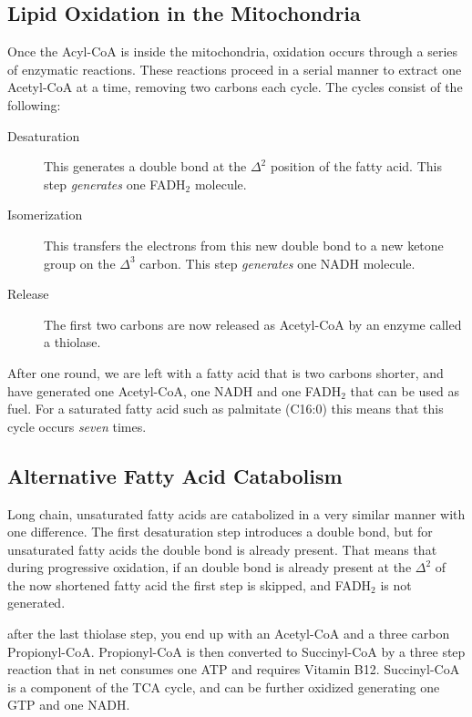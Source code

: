 \documentclass{tufte-handout}
\begin{document}
\subsection{Lipid Oxidation in the Mitochondria}

Once the Acyl-CoA is inside the mitochondria, oxidation occurs through a series of enzymatic reactions.  These reactions proceed in a serial manner to extract one Acetyl-CoA at a time, removing two carbons each cycle.  The cycles consist of the following:

\begin{description}
\item [Desaturation] This generates a double bond at the $\Delta^2$ position of the fatty acid.  This step \emph{generates} one FADH$_2$ molecule.
\item [Isomerization] This transfers the electrons from this new double bond to a new ketone group on the  $\Delta^3$ carbon.  This step \emph{generates} one NADH molecule.
\item [Release] The first two carbons are now released as Acetyl-CoA by an enzyme called a thiolase.
\end{description} 

After one round, we are left with a fatty acid that is two carbons shorter, and have generated one Acetyl-CoA, one NADH and one FADH$_2$ that can be used as fuel.  For a saturated fatty acid such as palmitate (C16:0) this means that this cycle occurs \emph{seven} times.

\subsection{Alternative Fatty Acid Catabolism}

Long chain, unsaturated fatty acids are catabolized in a very similar manner with one difference.  The first desaturation step introduces a double bond, but for unsaturated fatty acids the double bond is already present.  That means that during progressive oxidation, if an double bond is already present at the $\Delta^2$ of the now shortened fatty acid the first step is skipped, and FADH$_2$ is not generated.

 after the last thiolase step, you end up with an Acetyl-CoA and a three carbon Propionyl-CoA.  Propionyl-CoA is then converted to Succinyl-CoA by a three step reaction that in net consumes one ATP and requires Vitamin B12.  Succinyl-CoA is a component of the TCA cycle, and can be further oxidized generating one GTP and one NADH.  
\end{document}
